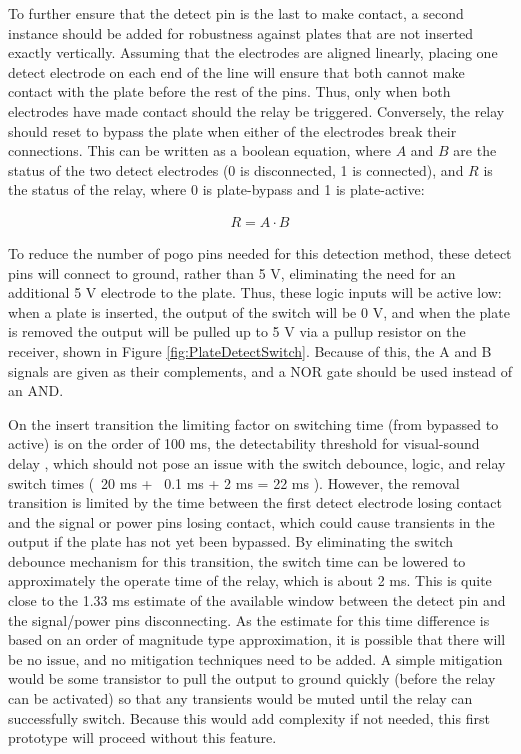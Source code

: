 \documentclass{article}
\begin{document}
		To further ensure that the detect pin is the last to make contact, a second instance should be added for robustness against plates that are not inserted exactly vertically.  Assuming that the electrodes are aligned linearly, placing one detect electrode on each end of the line will ensure that both cannot make contact with the plate before the rest of the pins.  Thus, only when both electrodes have made contact should the relay be triggered.  Conversely, the relay should reset to bypass the plate when either of the electrodes break their connections.  This can be written as a boolean equation, where $A$ and $B$ are the status of the two detect electrodes (0 is disconnected, 1 is connected), and $R$ is the status of the relay, where 0 is plate-bypass and 1 is plate-active:

		\begin{align}
			R = A \cdot B
		\end{align}

		To reduce the number of pogo pins needed for this detection method, these detect pins will connect to ground, rather than 5 V, eliminating the need for an additional 5 V electrode to the plate.  Thus, these logic inputs will be active low: when a plate is inserted, the output of the switch will be 0 V, and when the plate is removed the output will be pulled up to 5 V via a pullup resistor on the receiver, shown in Figure \ref{fig:PlateDetectSwitch}.  Because of this, the A and B signals are given as their complements, and a NOR gate should be used instead of an AND.  

		On the insert transition the limiting factor on switching time (from bypassed to active) is on the order of 100 ms, the detectability threshold for visual-sound delay \cite{RelativeTime}, which should not pose an issue with the switch debounce, logic, and relay switch times (~20 ms + ~0.1 ms + 2 ms = 22 ms \cite{EA2datasheet}).  However, the removal transition is limited by the time between the first detect electrode losing contact and the signal or power pins losing contact, which could cause transients in the output if the plate has not yet been bypassed.  By eliminating the switch debounce mechanism for this transition, the switch time can be lowered to approximately the operate time of the relay, which is about 2 ms.  This is quite close to the 1.33 ms estimate of the available window between the detect pin and the signal/power pins disconnecting.  As the estimate for this time difference is based on an order of magnitude type approximation, it is possible that there will be no issue, and no mitigation techniques need to be added.  A simple mitigation would be some transistor to pull the output to ground quickly (before the relay can be activated) so that any transients would be muted until the relay can successfully switch.  Because this would add complexity if not needed, this first prototype will proceed without this feature.
\end{document}
